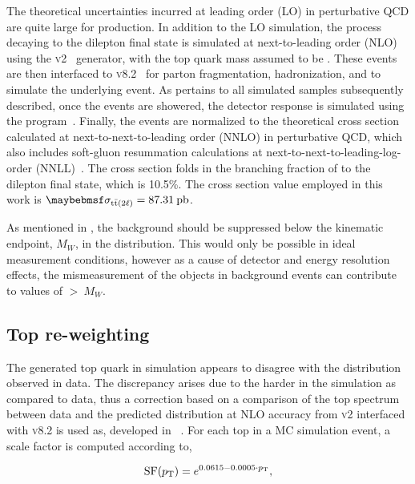 The theoretical uncertainties incurred at leading order (LO) in perturbative QCD are quite large for \ttbar production. In addition to the LO simulation, the \ttbar process decaying to the dilepton final state is simulated at next-to-leading order (NLO) using the \POWHEG \textsc{v2}~\cite{powheg,powheg2} generator, with the top quark mass assumed to be \:\GeV. These events are then interfaced to \Pythia \textsc{v8.2}~\cite{Sjostrand:2014zea} for parton fragmentation, hadronization, and to simulate the underlying event. As pertains to all simulated samples subsequently described, once the \ttll events are showered, the detector response is simulated using the  program~\cite{AGOSTINELLI2003250}. Finally, the \ttll events are normalized to the theoretical cross section calculated at next-to-next-to-leading order (NNLO) in perturbative QCD, which also includes soft-gluon resummation calculations at next-to-next-to-leading-log-order (NNLL)~\cite{ttxsec1,ttxsec2,ttxsec3,ttxsec4,ttxsec5}. The cross section folds in the branching fraction of \ttbar to the dilepton final state, which is 10.5\%. The cross section value employed in this work is $\sigma_{\ttll}=87.31\:\mathrm{pb}$.

As mentioned in , the \ttll background should be suppressed below the kinematic endpoint, $M_W$, in the \mttll distribution. This would only be possible in ideal measurement conditions, however as a cause of detector and energy resolution effects, the mismeasurement of the objects in \ttll background events can contribute to values of \mttll$>\:M_W$. 

\subsection{Top \pt re-weighting}
\label{subsec:toppt}
The generated top quark \pt in \ttbar simulation appears to disagree with the distribution observed in data. The discrepancy arises due to the harder \pt in the simulation as compared to data, thus a correction based on a comparison of the top \pt spectrum between data and the predicted distribution at NLO accuracy from \POWHEG \textsc{v2} interfaced with \Pythia \textsc{v8.2} is used as, developed in ~\cite{Khachatryan:2016mnb}. For each top in a \ttbar MC simulation event, a scale factor is computed according to, 

\begin{equation}
  \text{SF}(p_{\mathrm{T}}) = e^{0.0615 - 0.0005\cdot p_{\mathrm{T}}},
  \label{eq:toppt}
\end{equation}

